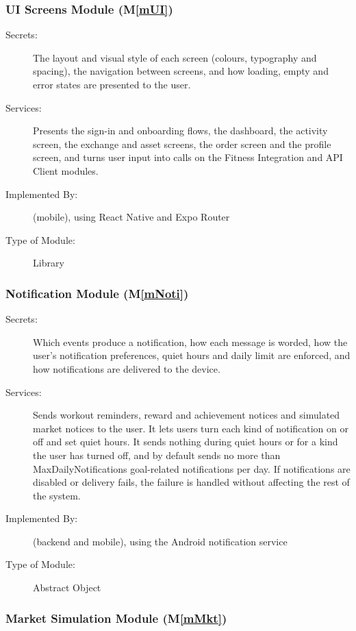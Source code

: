 \documentclass[12pt, titlepage]{article}
\newcommand{\mref}[1]{M\ref{#1}}
\begin{document}
\subsubsection{UI Screens Module (\mref{mUI})}

\begin{description}
\item[Secrets:] The layout and visual style of each screen (colours,
  typography and spacing), the navigation between screens, and
  how loading, empty and error states are presented to the user.
\item[Services:] Presents the sign-in and onboarding flows, the dashboard, the
  activity screen, the exchange and asset screens, the order screen and the
  profile screen, and turns user input into calls on the Fitness Integration
  and API Client modules.
\item[Implemented By:] \progname{} (mobile), using React Native and Expo Router
\item[Type of Module:] Library
\end{description}

\subsubsection{Notification Module (\mref{mNoti})}

\begin{description}
\item[Secrets:] Which events produce a notification, how each message is
  worded, how the user's notification preferences, quiet hours and daily limit
  are enforced, and how notifications are delivered to the device.
\item[Services:] Sends workout reminders, reward and achievement notices and
  simulated market notices to the user. It lets users turn each kind of
  notification on or off and set quiet hours. It sends nothing during quiet
  hours or for a kind the user has turned off, and by default sends no more
  than \textsf{MaxDailyNotifications} goal-related notifications per day. If
  notifications are disabled or delivery fails, the failure is handled without
  affecting the rest of the system.
\item[Implemented By:] \progname{} (backend and mobile), using the Android
  notification service
\item[Type of Module:] Abstract Object
\end{description}

\subsubsection{Market Simulation Module (\mref{mMkt})}
\end{document}
